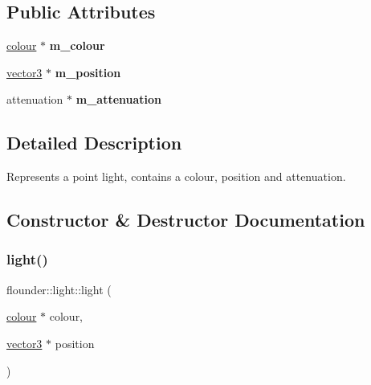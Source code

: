 \subsection*{Public Attributes}
\begin{DoxyCompactItemize}
\item 
\mbox{\label{classflounder_1_1light_a5bb9d5beecbe34f6f1e3902561ac63ba}} 
\hyperlink{classflounder_1_1colour}{colour} $\ast$ {\bfseries m\+\_\+colour}
\item 
\mbox{\label{classflounder_1_1light_aa4940db5738ced17a0ad3a8877a1c793}} 
\hyperlink{classflounder_1_1vector3}{vector3} $\ast$ {\bfseries m\+\_\+position}
\item 
\mbox{\label{classflounder_1_1light_a0d3e6d6c5c1bb029d483085983661e95}} 
attenuation $\ast$ {\bfseries m\+\_\+attenuation}
\end{DoxyCompactItemize}


\subsection{Detailed Description}
Represents a point light, contains a colour, position and attenuation. 



\subsection{Constructor \& Destructor Documentation}
\mbox{\label{classflounder_1_1light_a14ba36b32493ab4e40800f7146d90f00}} 
\subsubsection{\texorpdfstring{light()}{light()}\hspace{0.1cm}{\footnotesize\ttfamily [1/2]}}
{\footnotesize\ttfamily flounder\+::light\+::light (\begin{DoxyParamCaption}\item[{\hyperlink{classflounder_1_1colour}{colour} $\ast$}]{colour,  }\item[{\hyperlink{classflounder_1_1vector3}{vector3} $\ast$}]{position }\end{DoxyParamCaption})}



